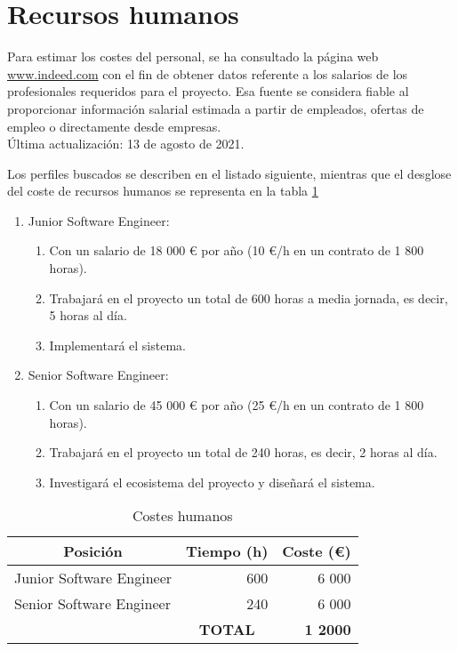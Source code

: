 \section{Recursos humanos}

Para estimar los costes del personal, se ha consultado la página web \url{www.indeed.com} con el fin de obtener datos referente a los salarios de los profesionales requeridos para el proyecto. Esa fuente se considera fiable al proporcionar información salarial estimada a partir de empleados, ofertas de empleo o directamente desde empresas. \\
Última actualización: 13 de agosto de 2021.

Los perfiles buscados se describen en el listado siguiente, mientras que el desglose del coste de recursos humanos se representa en la tabla \ref{tab:presupuesto-humanos}
\begin{enumerate}
	\item Junior Software Engineer:
	\begin{enumerate}
		\item Con un salario de 18 000 € por año (10 €/h en un contrato de 1 800 horas).
		\item Trabajará en el proyecto un total de 600 horas a media jornada, es decir, 5 horas al día.
		\item Implementará el sistema.
	\end{enumerate}

	\item Senior Software Engineer:
	\begin{enumerate}
		\item Con un salario de 45 000 € por año (25 €/h en un contrato de 1 800 horas).
		\item Trabajará en el proyecto un total de 240 horas, es decir, 2 horas al día.
		\item Investigará el ecosistema del proyecto y diseñará el sistema.
	\end{enumerate}
\end{enumerate}


\begin{table}[h]
\centering

\begin{tabular}{lcr}
\hline
\multicolumn{1}{c}{\textbf{Posición}} & \textbf{Tiempo (h)}     & \multicolumn{1}{c}{\textbf{Coste (€)}} \\ \hline
Junior Software Engineer              & \multicolumn{1}{r}{600} & 6 000                                   \\
Senior Software Engineer              & \multicolumn{1}{r}{240} & 6 000                                   \\ \hline
                                      & \textbf{TOTAL}          & \textbf{1 2000}
\end{tabular}%
\caption{Costes humanos}
\label{tab:presupuesto-humanos}
\end{table}

